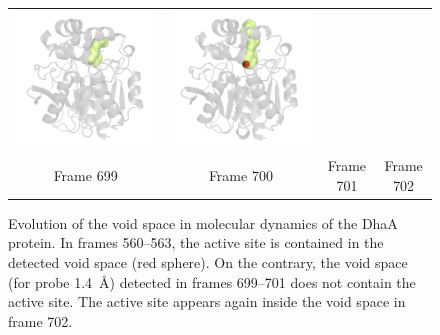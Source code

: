 \documentclass[usletter, 10pt, conference]{svjour3}      %
\begin{document}
\begin{figure}
{\begin{tabular}{cccc}
\includegraphics[width=\ee\textwidth]{fig/video-0701} &
\includegraphics[width=\ee\textwidth]{fig/video-0702}  \\
Frame 699 & Frame 700 & Frame 701 & Frame 702   \\                       
\end{tabular}
}
\caption{\label{fig::dyn}
Evolution of the void space in molecular dynamics of the DhaA protein. 
In frames 560--563, the active site is contained in the detected void space (red sphere).
On the contrary, the void space (for probe 1.4~\AA) detected in frames 699--701 does not contain the active site.
The active site appears again inside the void space in frame 702.
}
\end{figure}
\end{document}

